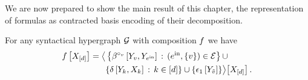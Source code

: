 We are now prepared to show the main result of this chapter, the representation of formulas as contracted basis encoding of their decomposition.

\begin{theorem}
    \label{the:formulaDecompositionRep}
    For any syntactical hypergraph $\mathcal{G}$ with composition $f$ we have
    \begin{align*}
        f\left[X_{[d]}\right]
        = \big\langle 
            &\left\{
            \beta^{\circ_{v}}\left[Y_{v},Y_{e^{\mathrm{in}}}\right] \,:\, (e^{\mathrm{in}},\{v\})\in\mathcal{E}
            \right\} \cup \\
            & \{\delta\left[Y_{k},X_{k}\right] \,:\, k\in[d]\}
            \cup \{\epsilon_1\left[Y_{\tilde{v}}\right]\}
         \big\rangle \big[ X_{[d]} \big] \, .
    \end{align*}
\end{theorem}
